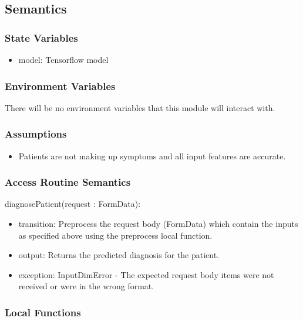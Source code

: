 \documentclass[12pt, titlepage]{article}
\begin{document}
\subsection{Semantics}

\subsubsection{State Variables}

\begin{itemize}
  \item model: Tensorflow model
\end{itemize}

\subsubsection{Environment Variables}

There will be no environment variables that this module will interact with.

\subsubsection{Assumptions}

\begin{itemize}
  \item Patients are not making up symptoms and all input features are accurate.
\end{itemize}

\subsubsection{Access Routine Semantics}

\noindent diagnosePatient(request : FormData):
\begin{itemize}
\item transition: Preprocess the request body (FormData) which contain the inputs as specified above using the preprocess local function. 
\item output: Returns the predicted diagnosis for the patient.
\item exception: InputDimError - The expected request body items were not received or were in the wrong format.
\end{itemize}

\subsubsection{Local Functions}
\end{document}
